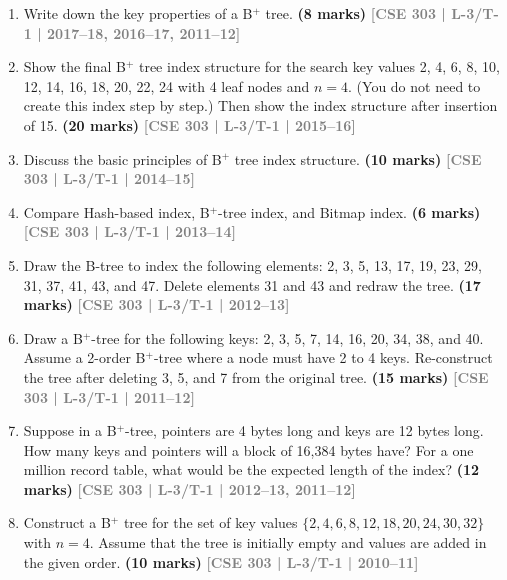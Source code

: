 \documentclass[12pt]{article}
\newcommand{\yr}[1]{\hfill\textcolor{gray}{\small\textbf{[#1]}}}
\newcommand{\mk}[1]{\textcolor{orange!70!black}{\small\textbf{(#1 marks)}}}
\begin{document}
\begin{enumerate}
\begin{center}
\begin{tikzpicture}[
        >=Stealth,
        arrow_style/.style={->, line width=0.6pt}
    ]

    \end{tikzpicture}
\end{center}

\mk{8} \yr{CSE 303 | L-3/T-1 | 2016--17}


\item Write down the key properties of a B$^+$ tree.
\mk{8} \yr{CSE 303 | L-3/T-1 | 2017--18, 2016--17, 2011--12}


\item Show the final B$^+$ tree index structure for the search key values 2, 4, 6, 8, 10, 12, 14, 16, 18, 20, 22, 24 with 4 leaf nodes and $n = 4$. (You do not need to create this index step by step.) Then show the index structure after insertion of 15.
\mk{20} \yr{CSE 303 | L-3/T-1 | 2015--16}


\item Discuss the basic principles of B$^+$ tree index structure.
\mk{10} \yr{CSE 303 | L-3/T-1 | 2014--15}


\item Compare Hash-based index, B$^+$-tree index, and Bitmap index.
\mk{6} \yr{CSE 303 | L-3/T-1 | 2013--14}


\item Draw the B-tree to index the following elements: 2, 3, 5, 13, 17, 19, 23, 29, 31, 37, 41, 43, and 47. Delete elements 31 and 43 and redraw the tree.
\mk{17} \yr{CSE 303 | L-3/T-1 | 2012--13}


\item Draw a B$^+$-tree for the following keys: 2, 3, 5, 7, 14, 16, 20, 34, 38, and 40. Assume a 2-order B$^+$-tree where a node must have 2 to 4 keys. Re-construct the tree after deleting 3, 5, and 7 from the original tree.
\mk{15} \yr{CSE 303 | L-3/T-1 | 2011--12}


\item Suppose in a B$^+$-tree, pointers are 4 bytes long and keys are 12 bytes long. How many keys and pointers will a block of 16,384 bytes have? For a one million record table, what would be the expected length of the index?
\mk{12} \yr{CSE 303 | L-3/T-1 | 2012--13, 2011--12}


\item Construct a B$^+$ tree for the set of key values $\{2, 4, 6, 8, 12, 18, 20, 24, 30, 32\}$ with $n = 4$. Assume that the tree is initially empty and values are added in the given order.
\mk{10} \yr{CSE 303 | L-3/T-1 | 2010--11}


\end{enumerate}
\end{document}
